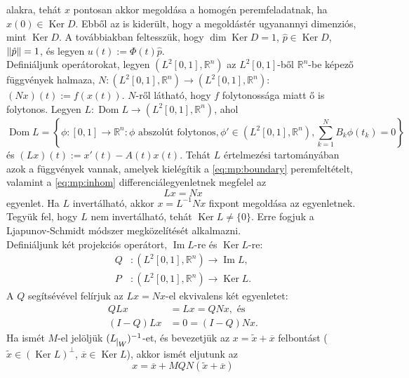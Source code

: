 \documentclass[oneside, titlepage, 12pt, a4paper]{report}
\DeclareMathOperator{\Ima}{Im}	%
\DeclareMathOperator{\Ker}{Ker}	%
\DeclareMathOperator{\Dom}{Dom}	%
\DeclarePairedDelimiter\norm{\lVert}{\rVert}	%
\begin{document}
alakra, tehát $x$ pontosan akkor megoldása a homogén peremfeladatnak, ha $x(0) \in \Ker D$. Ebből az is kiderült, hogy a megoldástér ugyanannyi dimenziós, mint $\Ker D$. A továbbiakban feltesszük, hogy $\dim \Ker D = 1$, $\hat{p} \in \Ker D$, $\norm{\hat{p}} = 1$, és legyen $u(t) := \Phi(t) \hat{p}$. \\
Definiáljunk operátorokat, legyen $( L^2[0, 1], \mathbb{R}^n)$ az $L^2[0, 1]$-ből $\mathbb{R}^n$-be képező függvények halmaza, $N : ( L^2[0, 1], \mathbb{R}^n) \rightarrow ( L^2[0, 1], \mathbb{R}^n)$: $(Nx)(t) := f(x(t))$. $N$-ről látható, hogy $f$ folytonossága miatt ő is folytonos. Legyen $L : \Dom L \rightarrow ( L^2[0, 1], \mathbb{R}^n)$, ahol
\begin{equation*}
\Dom L = \left\{ \phi : [0, 1] \rightarrow \mathbb{R}^n : \phi \text{ abszolút folytonos}, \phi' \in ( L^2[0, 1], \mathbb{R}^n), \sum_{k = 1}^N B_k \phi(t_k) = 0 \right\}
\end{equation*}
és $(Lx)(t) := x'(t) - A(t) x(t)$. Tehát $L$ értelmezési tartományában azok a függvények vannak, amelyek kielégítik a \eqref{eq:mp:boundary} peremfeltételt, valamint a \eqref{eq:mp:inhom} differenciálegyenletnek megfelel az
\begin{equation}
Lx = Nx \label{eq:mp:operator}
\end{equation}
egyenlet. Ha $L$ invertálható, akkor $x = L^{-1} N x$ fixpont megoldása az egyenletnek. Tegyük fel, hogy $L$ nem invertálható, tehát $\Ker L \neq \{ 0\}$. Erre fogjuk a Ljapunov-Schmidt módszer megközelítését alkalmazni. \\
Definiáljunk két projekciós operátort, $\Ima L$-re és $\Ker L$-re:
\begin{align*}
Q &: ( L^2[0, 1], \mathbb{R}^n) \rightarrow \Ima L, \\
P &: ( L^2[0, 1], \mathbb{R}^n) \rightarrow \Ker L.
\end{align*}
A $Q$ segítsévével felírjuk az $Lx = Nx$-el ekvivalens két egyenletet:
\begin{align}
Q L x &= L x = Q N x, \text{ és} \label{eq:mp:operatorIm} \\
(I - Q) L x &= 0 = (I -  Q) N x. \label{eq:mp:operatorIminIm}
\end{align}
Ha ismét $M$-el jelöljük $(L_{\mkern 1mu \vrule height 2ex\mkern2mu W})^{-1}$-et, és bevezetjük az $x = \widetilde{x} + \overline{x}$ felbontást ($\widetilde{x} \in (\Ker L)^\perp$, $\overline{x} \in \Ker L$), akkor ismét eljutunk az
\begin{equation*}
x = \overline{x} + M Q N (\widetilde{x} + \overline{x})
\end{equation*}
\end{document}
